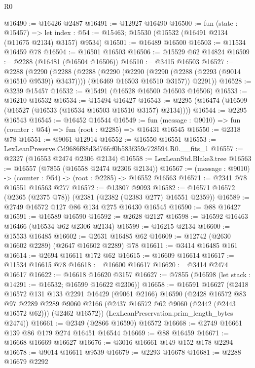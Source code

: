 \begin{lexlean}{R0}
\begin{coremodule}
@16490 := @16426 @2487
@16491 := @12927 @16490
@16500 := fun (state : @15457) =>
  let index : @54 := @15463; @15530 (@15532 (@16491 @2134 (@11675 @2134) @3157) @9534)
@16501 := @16489 @16500
@16503 := @11534 @16459 @78
@16504 := @16501 @16503
@16506 := @15529 @62 @14824
@16509 := @2288 (@16481 (@16504 @16506))
@16510 := @3415 @16503
@16527 := @2288
    (@2290
      (@2288
        (@2288
          (@2290 (@2290 (@2290 (@2288 (@2293 (@9014 @16510 @9539)) @3437))))
          (@16469 @16503 @16510 @3157))
        @2291))
@16528 := @3239 @15457
@16532 := @15491 (@16528 @16500 @16503 @16506)
@16533 := @16210 @16532
@16534 := @15494 @16427
@16543 := @2295 (@16474 (@16509 (@16527 (@16533 (@16534 @16503 @16510 @3157) @2134))))
@16544 := @2295 @16543
@16545 := @16452 @16544
@16549 := fun (message : @9010) => fun (counter : @54) => fun (root : @2285) => @16431 @16545
@16550 := @2318 @78
@16551 := @9061 @12914
@16552 := @16550 @16551
@16553 := LexLeanPreserve.Cd9686f88d3d76fcf0b583f359c728594.R0.__fits_1
@16557 := @2327 (@16553 @2474 @2306 @2134)
@16558 := LexLeanStd.Blake3.tree
@16563 := @16557 (@7855 (@16558 @2474 @2306 @2134))
@16567 := (message : @9010) -> (counter : @54) -> (root : @2285) -> @16552 @16563
@16571 := @2341 @78 @16551 @16563 @277
@16572 := @13807 @9093
@16582 := @16571 @16572 (@2365 (@2375 @78)) (@2381 (@2382 (@2383 @277) @16551 @2359))
@16589 := @2749 @16572 @127 @86 @134 @275 @16430 @16545
@16590 := @88 @16427
@16591 := @16589 @16590
@16592 := @2628 @2127
@16598 := @16592 @16463 @16466 (@16534 @62 @2306 @2134)
@16599 := @16215 @2134
@16600 := @15533 @16485
@16602 := @2631 @16485 @62
@16609 := @12742 (@2630 @16602 @2289) (@2647 @16602 @2289) @78
@16611 := @3414 @16485 @161
@16614 := @2694 @16611 @172 @62
@16615 := @16609 @16614
@16617 := @11534 @16615 @78
@16618 := @16600 @16617
@16620 := @3414 @2474 @16617
@16622 := @16618 @16620 @3157
@16627 := @7855 (@16598 (let stack : @14291 := @16532; @16599 @16622 @2306))
@16658 := @16591
    @16627
    (@2418
      @16572
      @131
      @133
      @2291
      @16429
      (@9061 @2166)
      @16590
      (@2428
        @16572
        @83
        @97
        @2289
        @2289
        @9060
        @2166
        (@2437 @16572 @62 @9060 (@2442 (@2443 @16572 @62)))
        (@2462 @16572))
      (LexLeanPreservation.prim_length_bytes @2474))
@16661 := @2349 (@2866 @16590) @16572
@16668 := @2749 @16661 @139 @86 @179 @274 @16451 @16544
@16669 := @88 @16459
@16671 := @16668 @16669 @16627
@16676 := @3016 @16661 @149 @152 @178 @2294
@16678 := @9014 @16611 @9539
@16679 := @2293 @16678
@16681 := @2288 @16679 @2292

\end{coremodule}
\end{lexlean}

